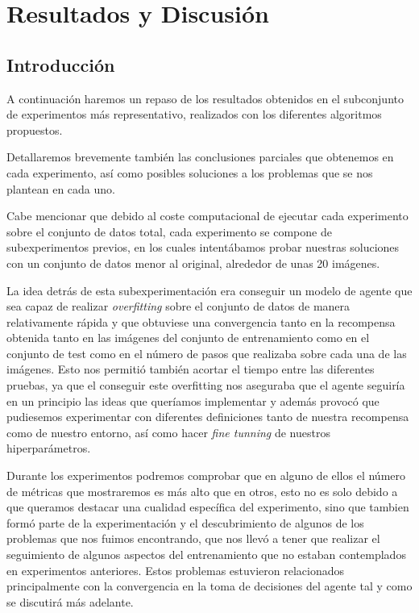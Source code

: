 
\cleardoublepage

\chapter{Resultados y Discusión}
\label{resultados-y-discusion}

\section{Introducción}
\label{resultados-introduccion}

A continuación haremos un repaso de los resultados obtenidos en el subconjunto de experimentos más representativo, realizados con los diferentes algoritmos propuestos.
\medskip

Detallaremos brevemente también las conclusiones parciales que obtenemos en cada experimento, así como posibles soluciones a los problemas que se nos plantean en cada uno.
\medskip

Cabe mencionar que debido al coste computacional de ejecutar cada experimento sobre el conjunto de datos total, cada experimento se compone de subexperimentos previos, en los cuales intentábamos probar nuestras soluciones con un conjunto de datos menor al original, alrededor de unas 20 imágenes. 
\medskip

La idea detrás de esta subexperimentación era conseguir un modelo de agente que sea capaz de realizar \textit{overfitting} sobre el conjunto de datos de manera relativamente rápida y que obtuviese una convergencia tanto en la recompensa obtenida tanto en las imágenes del conjunto de entrenamiento como en el conjunto de test como en el número de pasos que realizaba sobre cada una de las imágenes. Esto nos permitió también acortar el tiempo entre las diferentes pruebas, ya que el conseguir este overfitting nos aseguraba que el agente seguiría en un principio las ideas que queríamos implementar y además provocó que pudiesemos experimentar con diferentes definiciones tanto de nuestra recompensa como de nuestro entorno, así como hacer \textit{fine tunning} de nuestros hiperparámetros.
\medskip

Durante los experimentos podremos comprobar que en alguno de ellos el número de métricas que mostraremos es más alto que en otros, esto no es solo debido a que queramos destacar una cualidad específica del experimento, sino que tambien formó parte de la experimentación y el descubrimiento de algunos de los problemas que nos fuimos encontrando, que nos llevó a tener que realizar el seguimiento de algunos aspectos del entrenamiento que no estaban contemplados en experimentos anteriores. Estos problemas estuvieron relacionados principalmente con la convergencia en la toma de decisiones del agente tal y como se discutirá más adelante.
\medskip

